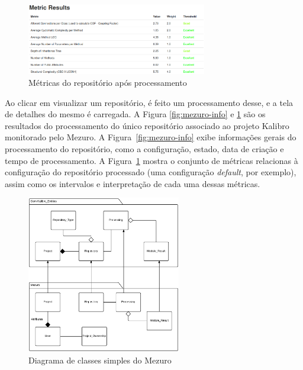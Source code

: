 \graphicspath{{figuras/}}
\begin{figure}[h]
\centering
\includegraphics[width=0.7\textwidth]{mezuro-result}
\caption{Métricas do repositório após processamento}
\label{fig:mezuro-result}
\end{figure}

Ao clicar em visualizar um repositório, é feito um processamento desse, e a tela de detalhes do mesmo é carregada. A Figura \ref{fig:mezuro-info} e \ref{fig:mezuro-result} são os resultados do processamento do único repositório associado ao projeto Kalibro monitorado pelo Mezuro.
%
A Figura~\ref{fig:mezuro-info} exibe informações gerais do processamento do repositório, como a configuração, estado, data de criação e tempo de processamento. A Figura~\ref{fig:mezuro-result} mostra o conjunto de métricas relacionas à configuração do repositório processado (uma configuração \textit{default}, por exemplo), assim como os intervalos e interpretação de cada uma dessas métricas.

\graphicspath{{figuras/}}
\begin{figure}[h]
\centering
\includegraphics[width=0.6\textwidth]{class-diagram-mezuro}
\caption{Diagrama de classes simples do Mezuro}
\label{class-diagram}
\end{figure}

